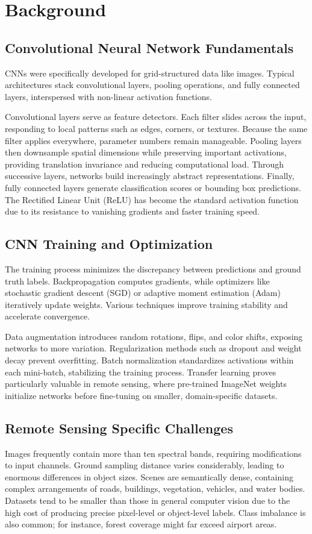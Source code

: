 \documentclass[12pt,a4paper]{article}
\begin{document}
\section{Background}
\label{sec:background}
\subsection{Convolutional Neural Network Fundamentals}
CNNs were specifically developed for grid-structured data like images. Typical architectures stack convolutional layers, pooling operations, and fully connected layers, interspersed with non-linear activation functions.

Convolutional layers serve as feature detectors. Each filter slides across the input, responding to local patterns such as edges, corners, or textures. Because the same filter applies everywhere, parameter numbers remain manageable. Pooling layers then downsample spatial dimensions while preserving important activations, providing translation invariance and reducing computational load. Through successive layers, networks build increasingly abstract representations. Finally, fully connected layers generate classification scores or bounding box predictions. The Rectified Linear Unit (ReLU) has become the standard activation function due to its resistance to vanishing gradients and faster training speed.

\subsection{CNN Training and Optimization}
The training process minimizes the discrepancy between predictions and ground truth labels. Backpropagation computes gradients, while optimizers like stochastic gradient descent (SGD) or adaptive moment estimation (Adam) iteratively update weights. Various techniques improve training stability and accelerate convergence.

Data augmentation introduces random rotations, flips, and color shifts, exposing networks to more variation. Regularization methods such as dropout and weight decay prevent overfitting. Batch normalization standardizes activations within each mini-batch, stabilizing the training process. Transfer learning proves particularly valuable in remote sensing, where pre-trained ImageNet weights initialize networks before fine-tuning on smaller, domain-specific datasets.

\subsection{Remote Sensing Specific Challenges}
Images frequently contain more than ten spectral bands, requiring modifications to input channels. Ground sampling distance varies considerably, leading to enormous differences in object sizes. Scenes are semantically dense, containing complex arrangements of roads, buildings, vegetation, vehicles, and water bodies. Datasets tend to be smaller than those in general computer vision due to the high cost of producing precise pixel-level or object-level labels. Class imbalance is also common; for instance, forest coverage might far exceed airport areas.
\end{document}
